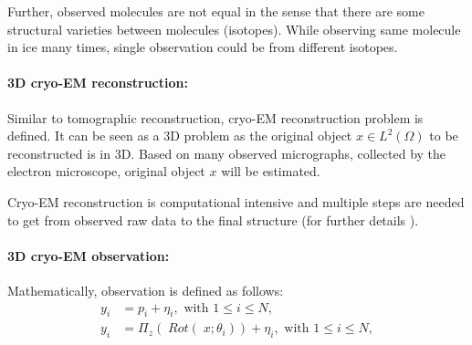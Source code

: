 Further, observed molecules are not equal in the sense that there are some structural varieties between
molecules (isotopes). While observing same molecule in ice many times, single observation could be from different isotopes.

\paragraph{3D cryo-EM reconstruction:}
Similar to tomographic reconstruction, cryo-EM reconstruction problem \cite{cryoEmMath} is defined.
It can be seen as a 3D problem as the original object $x \in L^2(\Omega)$ to be reconstructed is in 3D.
Based on many observed micrographs, collected by the electron microscope, original object $x$ will be estimated.

Cryo-EM reconstruction is computational intensive and multiple steps are needed to get from observed
raw data to the final structure (for further details \cite{singleParticleCryoEm}).


\paragraph{3D cryo-EM observation:}
Mathematically, observation is defined as follows:
\begin{equation}
    \label{eq:cryoEmSimple}
    \begin{aligned}
        y_i &= p_i + \eta_i, \text{ with } 1 \leq i \leq N,\\
        y_i &= \Pi_z  (\; Rot (\;x; \theta_i )) + \eta_i, \text{ with } 1 \leq i \leq N,    
    \end{aligned}
\end{equation}

